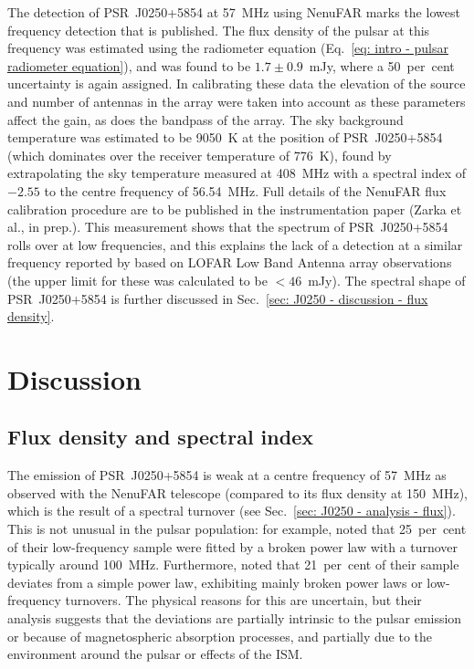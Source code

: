 The detection of PSR~J0250+5854 at 57~MHz using NenuFAR marks the lowest frequency detection that is published. The flux density of the pulsar at this frequency was estimated using the radiometer equation (Eq.~\eqref{eq: intro - pulsar radiometer equation}), and was found to be $1.7\pm0.9$~mJy, where a 50~per~cent uncertainty is again assigned. In calibrating these data the elevation of the source and number of antennas in the array were taken into account as these parameters affect the gain, as does the bandpass of the array. The sky background temperature was estimated to be 9050~K at the position of PSR~J0250+5854 (which dominates over the receiver temperature of 776~K), found by extrapolating the sky temperature measured at 408~MHz \citep{HSSW1982} with a spectral index of $-2.55$ \citep{LMOP1987, RRxx1988} to the centre frequency of 56.54~MHz. Full details of the NenuFAR flux calibration procedure are to be published in the instrumentation paper (Zarka et al., in prep.). This measurement shows that the spectrum of PSR~J0250+5854 rolls over at low frequencies, and this explains the lack of a detection at a similar frequency reported by \citet{TBC+2018} based on LOFAR Low Band Antenna array observations (the upper limit for these was calculated to be $<46$~mJy). The spectral shape of PSR~J0250+5854 is further discussed in Sec.~\eqref{sec: J0250 - discussion - flux density}.








\section{Discussion}
\label{sec: J0250 - discussion}

\subsection{Flux density and spectral index}
\label{sec: J0250 - discussion - flux density}

The emission of PSR~J0250+5854 is weak at a centre frequency of 57~MHz as observed with the NenuFAR telescope (compared to its flux density at 150~MHz), which is the result of a spectral turnover (see Sec.~\ref{sec: J0250 - analysis - flux}). This is not unusual in the pulsar population: for example, \citet{BKK+2016} noted that 25~per~cent of their low-frequency sample were fitted by a broken power law with a turnover typically around 100~MHz. Furthermore, \citet{JSK+2018} noted that 21~per~cent of their sample deviates from a simple power law, exhibiting mainly broken power laws or low-frequency turnovers. The physical reasons for this are uncertain, but their analysis suggests that the deviations are partially intrinsic to the pulsar emission or because of magnetospheric absorption processes, and partially due to the environment around the pulsar or effects of the ISM.

